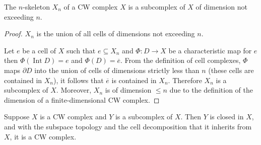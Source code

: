 \begin{note}\label{note:n-skeleton}
	The \( n \)-skeleton \( X_{n} \) of a CW complex \( X \) is a subcomplex of \( X \) of dimension not exceeding \( n \).
\end{note}

\begin{proof}
	\( X_{n} \) is the union of all cells of dimensions not exceeding \( n \).

	Let \( e \) be a cell of \( X \) such that \( e\subseteq X_{n} \) and \( \Phi: D \to X \) be a characteristic map for \( e \) then \( \Phi(\operatorname{Int} D) = e \) and \( \Phi(D) = \overline{e} \). From the definition of cell complexes, \( \Phi \) maps \( \partial D \) into the union of cells of dimensions strictly less than \( n \) (these cells are contained in \( X_{n} \)), it follows that \( \overline{e} \) is contained in \( X_{n} \). Therefore \( X_{n} \) is a subcomplex of \( X \). Moreover, \( X_{n} \) is of dimension \( \leq n \) due to the definition of the dimension of a finite-dimensional CW complex.
\end{proof}

\begin{theorem}{5.6}
	Suppose \( X \) is a CW complex and \( Y \) is a subcomplex of \( X \). Then \( Y \) is closed in \( X \), and with the subspace topology and the cell decomposition that it inherits from \( X \), it is a CW complex.
\end{theorem}

